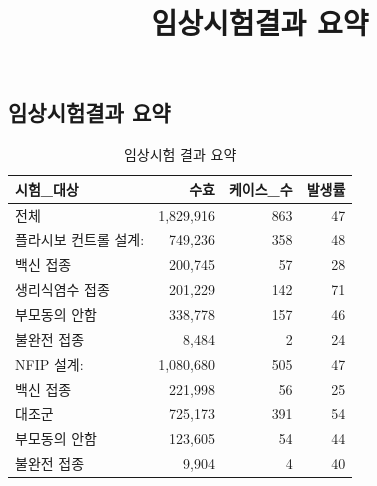 \documentclass[
]{article}
\title{임상시험결과 요약}
\author{}
\date{\vspace{-2.5em}}
\begin{document}
\maketitle

\subsection{임상시험결과
요약}\label{uxc784uxc0c1uxc2dcuxd5d8uxacb0uxacfc-uxc694uxc57d}

\begin{table}[!h]
\centering
\caption{\label{tab:unnamed-chunk-1}임상시험 결과 요약}
\centering
\begin{tabular}[t]{lrrr}
\toprule
시험\_대상 & 수효 & 케이스\_수 & 발생률\\
\midrule
전체 & 1,829,916 & 863 & 47\\
플라시보 컨트롤 설계: & 749,236 & 358 & 48\\
백신 접종 & 200,745 & 57 & 28\\
생리식염수 접종 & 201,229 & 142 & 71\\
부모동의 안함 & 338,778 & 157 & 46\\
\addlinespace
불완전 접종 & 8,484 & 2 & 24\\
NFIP 설계: & 1,080,680 & 505 & 47\\
백신 접종 & 221,998 & 56 & 25\\
대조군 & 725,173 & 391 & 54\\
부모동의 안함 & 123,605 & 54 & 44\\
\addlinespace
불완전 접종 & 9,904 & 4 & 40\\
\bottomrule
\end{tabular}
\end{table}
\end{document}
